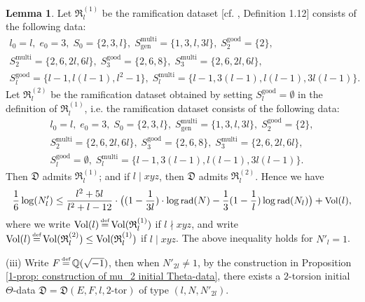 \documentclass[a4paper, 12pt]{article}
\DeclareMathOperator{\defeq}{\overset{\text{\tiny{def}}}{=}}
\DeclareMathOperator{\Q}{\mathbb{Q}}
\DeclareMathOperator{\rad}{\text{rad}}
\DeclareMathOperator{\good}{\text{good}}
\DeclareMathOperator{\multi}{\text{multi}}
\DeclareMathOperator{\gen}{\text{gen}}
\DeclareMathOperator{\Vol}{\text{Vol}}
\numberwithin{equation}{section}
\theoremstyle{definition}
\newtheorem{lem}[thm]{Lemma}
\begin{document}
\begin{lem}
Let $\mathfrak{R}_l^{(1)}$ be the ramification dataset [cf. \cite{Diophantine_after_IUT_I}, Definition 1.12] consists of the following data:
\begin{gather*}
l_0 = l, \; e_0 = 3, \; S_0=\{2,3,l\}, \; S_{\gen}^{\multi} = \{1,3,l,3l\}, \; S_2^{\good} = \{2\}, \\ 
S_2^{\multi} = \{2,6,2l,6l\}, \; S_3^{\good} = \{2,6,8\},  \; S_3^{\multi} = \{2,6,2l,6l\}, \\
S_l^{\good} = \{l-1, l(l-1), l^2-1\}, \;   S_l^{\multi} = \{l-1, 3(l-1), l(l-1), 3l(l-1)\} .
\end{gather*}
Let $\mathfrak{R}_l^{(2)}$ be the ramification dataset obtained by setting $S_l^{\good} = \emptyset$ in the definition of $\mathfrak{R}_l^{(1)}$, i.e. the ramification dataset consists of the following data:
\begin{gather*}
l_0 = l, \; e_0 = 3, \; S_0=\{2,3,l\}, \; S_{\gen}^{\multi} = \{1,3,l,3l\}, \; S_2^{\good} = \{2\}, \\ 
S_2^{\multi} = \{2,6,2l,6l\}, \; S_3^{\good} = \{2,6,8\},  \; S_3^{\multi} = \{2,6,2l,6l\}, \\
S_l^{\good} = \emptyset, \;   S_l^{\multi} = \{l-1, 3(l-1), l(l-1), 3l(l-1)\} .
\end{gather*}
Then $\mathfrak D$ admits $\mathfrak R_l^{(1)}$; and if $l\mid xyz$, then $\mathfrak D$ admits $\mathfrak R_l^{(2)}$.
Hence we have 
\begin{equation} \small \label{2-1-eq1}
    \frac{1}{6}\log(N'_l) \le  \frac{l^2+5l}{l^2+l-12}\cdot \big( (1-\frac{1}{3  l})\cdot \log\rad(N) - \frac{1}{3}(1- \frac{1}{l}) \log\rad(N_l)  \big) + \Vol(l),
\end{equation}
where we write $\Vol(l) \defeq \Vol(\mathfrak R_l^{(1)})$ if $l\nmid xyz$, and write $\Vol(l) \defeq \Vol(\mathfrak R_l^{(2)}) \le \Vol(\mathfrak R_l^{(1)})$ if $l\mid xyz$.
The above inequality holds for $N'_l = 1$.

(iii) Write $F\defeq \Q(\sqrt{-1})$, then when $N'_{2l} \neq 1$, by the construction in Proposition \ref{1-prop: construction of mu_2 initial Theta-data}, there exists a $2$-torsion initial $\Theta$-data $\mathfrak D = \mathfrak D(E,F,l,2\text{-tor})$ of type $(l, N, N'_{2l})$.


\end{lem}
\end{document}
